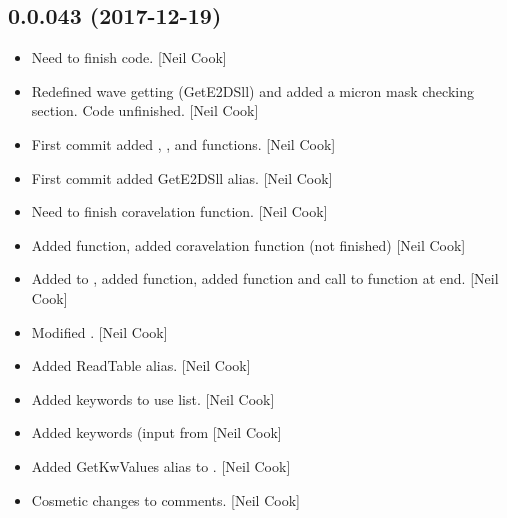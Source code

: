 \documentclass[a4paper,10pt,english]{report}
\begin{document}
\subsection{0.0.043 (2017-12-19)}
\label{\detokenize{misc/changelog:id508}}\begin{itemize}
\item {} 
Need to finish code. {[}Neil Cook{]}

\item {} 
Redefined wave getting (GetE2DSll) and added a micron mask checking
section. Code unfinished. {[}Neil Cook{]}

\item {} 
First commit added , , and
 functions. {[}Neil Cook{]}

\item {} 
First commit added GetE2DSll alias. {[}Neil Cook{]}

\item {} 
Need to finish coravelation function. {[}Neil Cook{]}

\item {} 
Added  function, added coravelation function (not
finished) {[}Neil Cook{]}

\item {} 
Added to , added  function, added 
function and call to function at end. {[}Neil Cook{]}

\item {} 
Modified . {[}Neil Cook{]}

\item {} 
Added ReadTable alias. {[}Neil Cook{]}

\item {} 
Added keywords to use list. {[}Neil Cook{]}

\item {} 
Added  keywords (input from  {[}Neil Cook{]}

\item {} 
Added GetKwValues alias to . {[}Neil Cook{]}

\item {} 
Cosmetic changes to comments. {[}Neil Cook{]}

\end{itemize}
\end{document}
